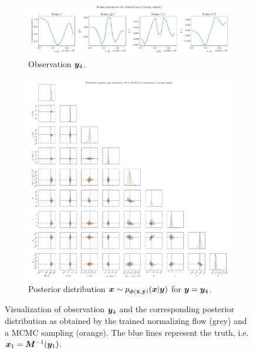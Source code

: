 \documentclass[a4paper,12pt]{report}
\begin{document}
\begin{figure}[h]
	\centering
	\begin{subfigure}[t]{\textwidth}
	\centering
	\includegraphics[width=\textwidth]{figures/nf-milne-eddington-example-6-corner-spectrum-4-nf-nflows-piecewisequadratic.pdf}
    \caption{Observation $\bm{y}_4$.}
	\end{subfigure}
	\begin{subfigure}[t]{\textwidth}
	\centering
	\includegraphics[width=\textwidth]{figures/nf-milne-eddington-example-6-corner-4-nf-mcmc-nflows-piecewisequadratic.pdf}
    \caption{Posterior distribution $\bm{x}\sim p_{\bm{\phi}(\hat{\boldsymbol{\mathbf{x}}},\hat{\boldsymbol{\mathbf{y}}})}(\bm{x}|\bm{y})$ for $\bm{y} = \bm{y}_4$.}
	\end{subfigure}
\cprotect\caption{Visualization of observation $\bm{y}_4$ and the corresponding posterior distribution as obtained by the trained normalizing flow (grey) and a MCMC sampling (orange). The blue lines represent the truth, i.e. $\bm{x}_1 = \bm{M}^{-1}(\bm{y}_1)$.}
\label{fig:nf-milne-eddington-example-6-corner-4-nf-piecewisequadratic-results}
\end{figure}
\end{document}
